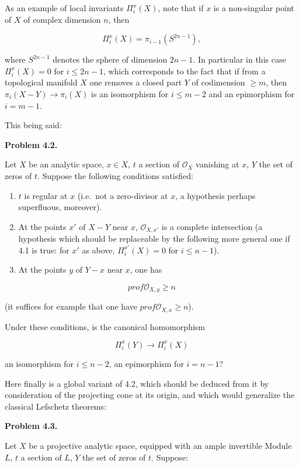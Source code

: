 \documentclass[
]{article}
\begin{document}
As an example of local invariants \(\Pi^{x}_{i}(X)\), note that if \(x\)
is a non-singular point of \(X\) of complex dimension \(n\), then

\[
\Pi^{x}_{i}(X) = \pi_{i-1}(S^{2n-1}),
\]

where \(S^{2n-1}\) denotes the sphere of dimension \(2n - 1\). In
particular in this case \(\Pi^{x}_{i}(X) = 0\) for
\(i \leqslant 2n - 1\), which corresponds to the fact that if from a
topological manifold \(X\) one removes a closed part \(Y\) of
codimension \(\geqslant m\), then \(\pi_{i}(X - Y) \to \pi_{i}(X)\) is
an isomorphism for \(i \leqslant m - 2\) and an epimorphism for
\(i = m - 1\).

This being said:

\textbf{Problem 4.2.}

Let \(X\) be an analytic space, \(x \in X\), \(t\) a section of
\(\mathcal{O}_{X}\) vanishing at \(x\), \(Y\) the set of zeros of \(t\).
Suppose the following conditions satisfied:

\begin{enumerate}
\def\labelenumi{\alph{enumi})}
\item
  \(t\) is regular at \(x\) (i.e.~not a zero-divisor at \(x\), a
  hypothesis perhaps superfluous, moreover).
\item
  At the points \(x'\) of \(X - Y\) near \(x\), \(\mathcal{O}_{X,x'}\)
  is a complete intersection (a hypothesis which should be replaceable
  by the following more general one if 4.1 is true: for \(x'\) as above,
  \(\Pi^{x'}_{i}(X) = 0\) for \(i \leqslant n - 1\)).
\item
  At the points \(y\) of \(Y - {x}\) near \(x\), one has
\end{enumerate}

\[
prof \mathcal{O}_{X,y} \geqslant n
\]

(it suffices for example that one have
\(prof \mathcal{O}_{X,x} \geqslant n\)).

Under these conditions, is the canonical homomorphism

\[
\Pi^{x}_{i}(Y) \to \Pi^{x}_{i}(X)
\]

an isomorphism for \(i \leqslant n - 2\), an epimorphism for
\(i = n - 1\)?

Here finally is a global variant of 4.2, which should be deduced from it
by consideration of the projecting cone at its origin, and which would
generalize the classical Lefschetz theorems:

\textbf{Problem 4.3.}

Let \(X\) be a projective analytic space, equipped with an ample
invertible Module \(L\), \(t\) a section of \(L\), \(Y\) the set of
zeros of \(t\). Suppose:
\end{document}
